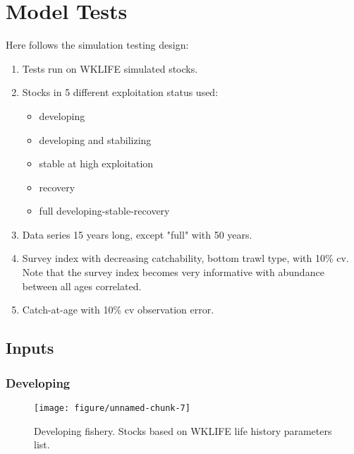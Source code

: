 \documentclass[a4paper]{article}\usepackage{graphicx, color}
\makeatletter
\def\maxwidth{ %
  \ifdim\Gin@nat@width>\linewidth
    \linewidth
  \else
    \Gin@nat@width
  \fi
}
\newenvironment{knitrout}{}{} %
\makeatother
\begin{document}
\section*{Model Tests}

Here follows the simulation testing design:

\begin{enumerate}
	\item Tests run on WKLIFE simulated stocks.
	\item Stocks in 5 different exploitation status used:
	\begin{itemize}
		\item developing
		\item developing and stabilizing
		\item stable at high exploitation
		\item recovery
		\item full developing-stable-recovery
	\end{itemize}
	\item Data series 15 years long, except "full" with 50 years.
	\item Survey index with decreasing catchability, bottom trawl type, with 10\% cv. Note that the survey index becomes very informative with abundance between all ages correlated. 
	\item Catch-at-age with 10\% cv observation error. 
\end{enumerate}

\subsection*{Inputs}
\subsubsection*{Developing}

\begin{knitrout}
\color{fgcolor}\begin{figure}[H]


{\centering \texttt{[image: figure/unnamed-chunk-7]} 

}

\caption[Developing fishery]{Developing fishery. Stocks based on WKLIFE life history parameters list.\label{fig:unnamed-chunk-7}}
\end{figure}

\end{knitrout}
\end{document}
